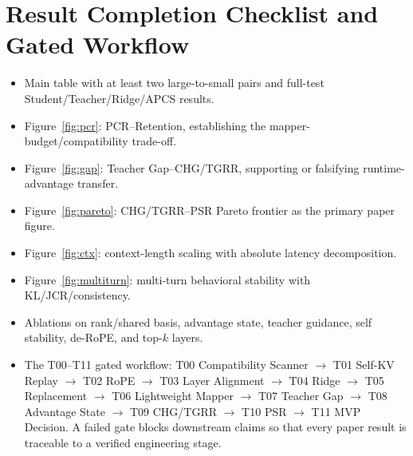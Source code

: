 \documentclass[10pt]{article}
\newcommand{\method}{APCS}
\begin{document}
\section{Result Completion Checklist and Gated Workflow}
\begin{itemize}[leftmargin=*,nosep]
  \item Main table with at least two large-to-small pairs and full-test Student/Teacher/Ridge/\method{} results.
  \item Figure~\ref{fig:pcr}: PCR--Retention, establishing the mapper-budget/compatibility trade-off.
  \item Figure~\ref{fig:gap}: Teacher Gap--CHG/TGRR, supporting or falsifying runtime-advantage transfer.
  \item Figure~\ref{fig:pareto}: CHG/TGRR--PSR Pareto frontier as the primary paper figure.
  \item Figure~\ref{fig:ctx}: context-length scaling with absolute latency decomposition.
  \item Figure~\ref{fig:multiturn}: multi-turn behavioral stability with KL/JCR/consistency.
  \item Ablations on rank/shared basis, advantage state, teacher guidance, self stability, de-RoPE, and top-$k$ layers.
  \item The T00--T11 gated workflow: T00 Compatibility Scanner $\rightarrow$ T01 Self-KV Replay
  $\rightarrow$ T02 RoPE $\rightarrow$ T03 Layer Alignment $\rightarrow$ T04 Ridge $\rightarrow$
  T05 Replacement $\rightarrow$ T06 Lightweight Mapper $\rightarrow$ T07 Teacher Gap $\rightarrow$
  T08 Advantage State $\rightarrow$ T09 CHG/TGRR $\rightarrow$ T10 PSR $\rightarrow$ T11 MVP
  Decision. A failed gate blocks downstream claims so that every paper result is traceable to a
  verified engineering stage.
\end{itemize}
\end{document}

